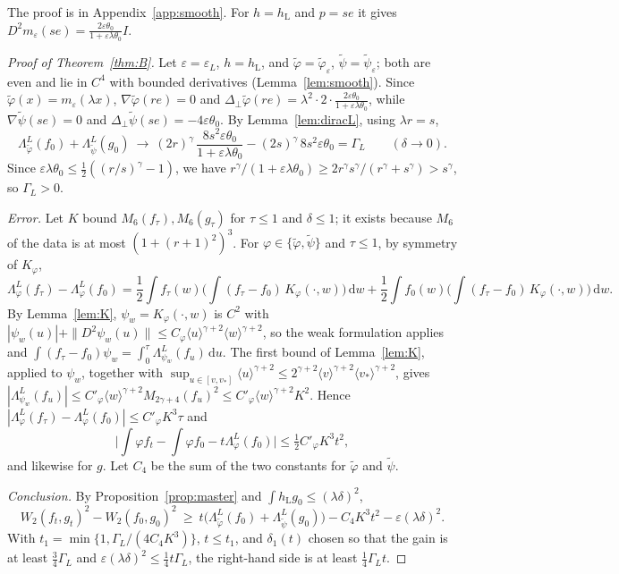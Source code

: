 \documentclass[11pt]{amsart}
\theoremstyle{definition}
\newcommand{\dd}{\,\mathrm{d}}
\newcommand{\jb}[1]{\langle #1\rangle}
\newcommand{\hL}{h_{\mathrm L}}
\begin{document}
The proof is in Appendix~\ref{app:smooth}. For $h=\hL$ and $p=se$ it gives $D^2m_\varepsilon(se)=\frac{2\varepsilon\theta_0}{1+\varepsilon\lambda\theta_0}I$.

\begin{proof}[Proof of Theorem~\ref{thm:B}]
Let $\varepsilon=\varepsilon_L$, $h=\hL$, and $\tilde\varphi=\tilde\varphi_\varepsilon$, $\tilde\psi=\tilde\psi_\varepsilon$; both are even and lie in $C^4$ with bounded derivatives (Lemma~\ref{lem:smooth}). Since $\tilde\varphi(x)=m_\varepsilon(\lambda x)$, $\nabla\tilde\varphi(re)=0$ and $\Delta_\perp\tilde\varphi(re)=\lambda^2\cdot2\cdot\frac{2\varepsilon\theta_0}{1+\varepsilon\lambda\theta_0}$, while $\nabla\tilde\psi(se)=0$ and $\Delta_\perp\tilde\psi(se)=-4\varepsilon\theta_0$. By Lemma~\ref{lem:diracL}, using $\lambda r=s$,
\[
\Lambda^L_{\tilde\varphi}(f_0)+\Lambda^L_{\tilde\psi}(g_0)\ \longrightarrow\ (2r)^\gamma\,\frac{8s^2\varepsilon\theta_0}{1+\varepsilon\lambda\theta_0}-(2s)^\gamma\,8s^2\varepsilon\theta_0=\Gamma_L\qquad(\delta\to0).
\]
Since $\varepsilon\lambda\theta_0\le\frac12((r/s)^\gamma-1)$, we have $r^\gamma/(1+\varepsilon\lambda\theta_0)\ge2r^\gamma s^\gamma/(r^\gamma+s^\gamma)>s^\gamma$, so $\Gamma_L>0$.

\emph{Error.} Let $K$ bound $M_6(f_\tau),M_6(g_\tau)$ for $\tau\le1$ and $\delta\le1$; it exists because $M_6$ of the data is at most $(1+(r+1)^2)^3$. For $\varphi\in\{\tilde\varphi,\tilde\psi\}$ and $\tau\le1$, by symmetry of $K_\varphi$,
\[
\Lambda^L_\varphi(f_\tau)-\Lambda^L_\varphi(f_0)=\frac12\int f_\tau(w)\Big(\int(f_\tau-f_0)\,K_\varphi(\cdot,w)\Big)\dd w+\frac12\int f_0(w)\Big(\int(f_\tau-f_0)\,K_\varphi(\cdot,w)\Big)\dd w .
\]
By Lemma~\ref{lem:K}, $\psi_w=K_\varphi(\cdot,w)$ is $C^2$ with $|\psi_w(u)|+\|D^2\psi_w(u)\|\le C_\varphi\jb{u}^{\gamma+2}\jb{w}^{\gamma+2}$, so the weak formulation applies and $\int(f_\tau-f_0)\psi_w=\int_0^\tau\Lambda^L_{\psi_w}(f_u)\dd u$. The first bound of Lemma~\ref{lem:K}, applied to $\psi_w$, together with $\sup_{u\in[v,v_*]}\jb{u}^{\gamma+2}\le2^{\gamma+2}\jb{v}^{\gamma+2}\jb{v_*}^{\gamma+2}$, gives $|\Lambda^L_{\psi_w}(f_u)|\le C'_\varphi\jb{w}^{\gamma+2}M_{2\gamma+4}(f_u)^2\le C'_\varphi\jb{w}^{\gamma+2}K^2$. Hence $|\Lambda^L_\varphi(f_\tau)-\Lambda^L_\varphi(f_0)|\le C'_\varphi K^3\tau$ and
\[
\Big|\int\varphi f_t-\int\varphi f_0-t\Lambda^L_\varphi(f_0)\Big|\le\tfrac12C'_\varphi K^3t^2 ,
\]
and likewise for $g$. Let $C_4$ be the sum of the two constants for $\tilde\varphi$ and $\tilde\psi$.

\emph{Conclusion.} By Proposition~\ref{prop:master} and $\int\hL g_0\le(\lambda\delta)^2$,
\[
W_2(f_t,g_t)^2-W_2(f_0,g_0)^2\ \ge\ t\big(\Lambda^L_{\tilde\varphi}(f_0)+\Lambda^L_{\tilde\psi}(g_0)\big)-C_4K^3t^2-\varepsilon(\lambda\delta)^2 .
\]
With $t_1=\min\{1,\Gamma_L/(4C_4K^3)\}$, $t\le t_1$, and $\delta_1(t)$ chosen so that the gain is at least $\frac34\Gamma_L$ and $\varepsilon(\lambda\delta)^2\le\frac14t\Gamma_L$, the right-hand side is at least $\frac14\Gamma_Lt$.
\end{proof}
\end{document}

